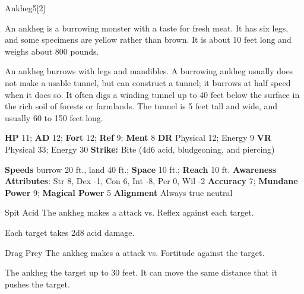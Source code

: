   \begin{monsection}{Ankheg}{5}[2]
    \vspace{-1em}\vspace{-1em}
    \vspace{0em}

    
      An ankheg is a burrowing monster with a taste for fresh meat. It has six legs, and some specimens are yellow rather than brown. It is about 10 feet long and weighs about 800 pounds.

      An ankheg burrows with legs and mandibles. A burrowing ankheg usually does not make a usable tunnel, but can construct a tunnel; it burrows at half speed when it does so. It often digs a winding tunnel up to 40 feet below the surface in the rich soil of forests or farmlands. The tunnel is 5 feet tall and wide, and usually 60 to 150 feet long.
    
    

    \begin{spellcontent}
      \begin{spelltargetinginfo}
        \pari \textbf{HP} 11;
          \textbf{AD} 12;
          \textbf{Fort} 12;
          \textbf{Ref} 9;
          \textbf{Ment} 8
        \pari \textbf{DR} Physical 12; Energy 9
        \pari \textbf{VR} Physical 33; Energy 30
        \pari \textbf{Strike:}
            Bite  (4d6 acid, bludgeoning, and piercing)
      \end{spelltargetinginfo}
    \end{spellcontent}
    \begin{monsterfooter}
      \pari \textbf{Speeds} burrow 20 ft., land 40 ft.;
        \textbf{Space} 10 ft.;
        \textbf{Reach} 10 ft.
      \pari \textbf{Awareness} 
      \pari \textbf{Attributes}:
        Str 8, Dex -1,
        Con 6, Int -8,
        Per 0, Wil -2
      \pari \textbf{Accuracy} 7;
        \textbf{Mundane Power} 9;
      \textbf{Magical Power} 5
      \pari \textbf{Alignment} Always true neutral
    \end{monsterfooter}
  \end{monsection}
  \begin{freeability}{Spit Acid}
       The ankheg makes a  attack
        vs. Reflex against each target.
    
    \hit Each target takes 2d8 acid damage.
    \end{freeability}
  

    \begin{freeability}{Drag Prey}
       The ankheg makes a  attack
        vs. Fortitude against the target.
    
    \hit The ankheg  the target up to 30 feet.
          It can move the same distance that it pushes the target.
    \end{freeability}
  
